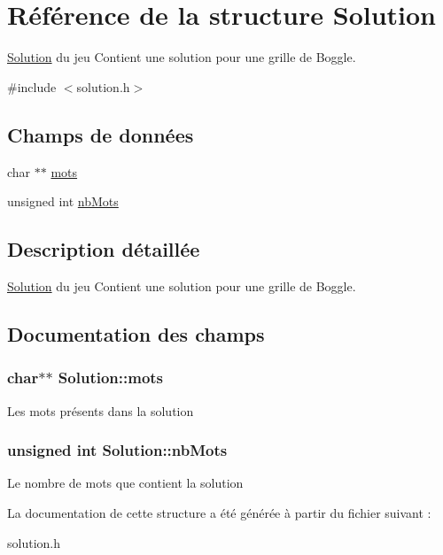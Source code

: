 \hypertarget{structSolution}{\section{Référence de la structure Solution}
\label{structSolution}
}


\hyperlink{structSolution}{Solution} du jeu Contient une solution pour une grille de Boggle.  




{\ttfamily \#include $<$solution.\-h$>$}

\subsection*{Champs de données}
\begin{DoxyCompactItemize}
\item 
char $\ast$$\ast$ \hyperlink{structSolution_ab511245410043c846351c6acf272d656}{mots}
\item 
unsigned int \hyperlink{structSolution_a60e0881a49e593091d2210dd49f2f51a}{nb\-Mots}
\end{DoxyCompactItemize}


\subsection{Description détaillée}
\hyperlink{structSolution}{Solution} du jeu Contient une solution pour une grille de Boggle. 

\subsection{Documentation des champs}
\hypertarget{structSolution_ab511245410043c846351c6acf272d656}{
\subsubsection[{mots}]{\setlength{\rightskip}{0pt plus 5cm}char$\ast$$\ast$ Solution\-::mots}}\label{structSolution_ab511245410043c846351c6acf272d656}
Les mots présents dans la solution \hypertarget{structSolution_a60e0881a49e593091d2210dd49f2f51a}{
\subsubsection[{nb\-Mots}]{\setlength{\rightskip}{0pt plus 5cm}unsigned int Solution\-::nb\-Mots}}\label{structSolution_a60e0881a49e593091d2210dd49f2f51a}
Le nombre de mots que contient la solution 

La documentation de cette structure a été générée à partir du fichier suivant \-:\begin{DoxyCompactItemize}
\item 
solution.\-h\end{DoxyCompactItemize}
